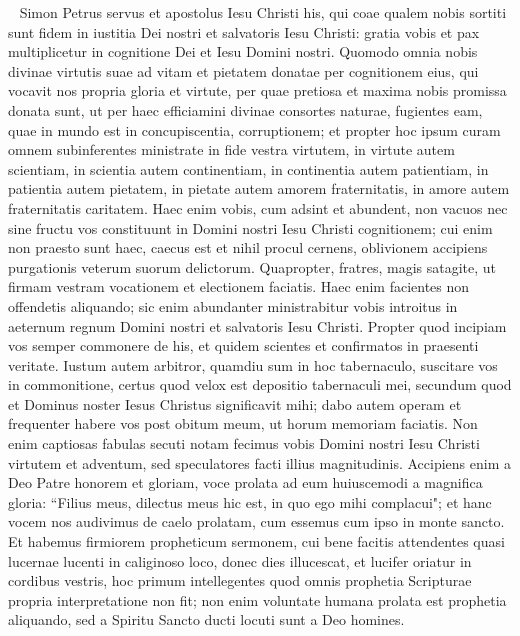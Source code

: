 
\begin{biblechapter}  
\verse Simon Petrus servus et apostolus Iesu Christi his, qui coae qualem nobis sortiti sunt fidem in iustitia Dei nostri et salvatoris Iesu Christi: 
\verse gratia vobis et pax multiplicetur in cognitione Dei et Iesu Domini nostri. 
\verse Quomodo omnia nobis divinae virtutis suae ad vitam et pietatem donatae per cognitionem eius, qui vocavit nos propria gloria et virtute, 
\verse per quae pretiosa et maxima nobis promissa donata sunt, ut per haec efficiamini divinae consortes naturae, fugientes eam, quae in mundo est in concupiscentia, corruptionem; 
\verse et propter hoc ipsum curam omnem subinferentes ministrate in fide vestra virtutem, in virtute autem scientiam, 
\verse in scientia autem continentiam, in continentia autem patientiam, in patientia autem pietatem, 
\verse in pietate autem amorem fraternitatis, in amore autem fraternitatis caritatem. 
\verse Haec enim vobis, cum adsint et abundent, non vacuos nec sine fructu vos constituunt in Domini nostri Iesu Christi cognitionem; 
\verse cui enim non praesto sunt haec, caecus est et nihil procul cernens, oblivionem accipiens purgationis veterum suorum delictorum. 
\verse Quapropter, fratres, magis satagite, ut firmam vestram vocationem et electionem faciatis. Haec enim facientes non offendetis aliquando; 
\verse sic enim abundanter ministrabitur vobis introitus in aeternum regnum Domini nostri et salvatoris Iesu Christi. 
\verse Propter quod incipiam vos semper commonere de his, et quidem scientes et confirmatos in praesenti veritate. 
\verse Iustum autem arbitror, quamdiu sum in hoc tabernaculo, suscitare vos in commonitione, 
\verse certus quod velox est depositio tabernaculi mei, secundum quod et Dominus noster Iesus Christus significavit mihi; 
\verse dabo autem operam et frequenter habere vos post obitum meum, ut horum memoriam faciatis. 
\verse Non enim captiosas fabulas secuti notam fecimus vobis Domini nostri Iesu Christi virtutem et adventum, sed speculatores facti illius magnitudinis.  
\verse Accipiens enim a Deo Patre honorem et gloriam, voce prolata ad eum huiuscemodi a magnifica gloria: “Filius meus, dilectus meus hic est, in quo ego mihi complacui"; 
\verse et hanc vocem nos audivimus de caelo prolatam, cum essemus cum ipso in monte sancto. 
\verse Et habemus firmiorem propheticum sermonem, cui bene facitis attendentes quasi lucernae lucenti in caliginoso loco, donec dies illucescat, et lucifer oriatur in cordibus vestris, 
\verse hoc primum intellegentes quod omnis prophetia Scripturae propria interpretatione non fit; 
\verse non enim voluntate humana prolata est prophetia aliquando, sed a Spiritu Sancto ducti locuti sunt a Deo homines. 
\end{biblechapter}

